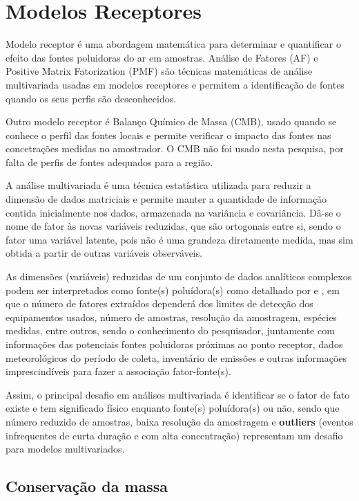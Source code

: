 \section{Modelos Receptores}

Modelo receptor é uma abordagem matemática para determinar e 
quantificar o efeito das fontes poluidoras do ar em amostras.
Análise de Fatores (AF) e Positive Matrix Fatorization (PMF) são técnicas 
matemáticas de análise multivariada usadas em modelos receptores e 
permitem a identificação de fontes quando os seus perfis são desconhecidos.

Outro modelo receptor é Balanço Químico de Massa (CMB), usado quando se conhece 
o perfil das fontes locais e permite verificar o impacto das fontes 
nas concetrações medidas no amostrador. O CMB não foi usado nesta pesquisa, 
por falta de perfis de fontes adequados para a região.

A análise multivariada é uma técnica estatística utilizada para 
reduzir a dimensão de dados matriciais e permite manter a quantidade de 
informação contida inicialmente nos dados, armazenada na variância e covariância. 
Dâ-se o nome de fator às novas variáveis reduzidas, que são ortogonais entre si,  
sendo o fator uma variável latente, pois não é uma grandeza diretamente
medida, mas sim obtida a partir de outras variáveis observáveis. 

As dimensões (variáveis) reduzidas de um conjunto de dados analíticos 
complexos podem ser interpretados como fonte(s) poluídora(s) como detalhado por
\citet{wang2012} e \citet{mansha2012}, em que o número de fatores extraídos 
dependerá dos limites de detecção dos equipamentos usados, número de amostras, 
resolução da amostragem, espécies medidas, entre outros, sendo o conhecimento 
do pesquisador, juntamente com informações das potenciais fontes poluidoras 
próximas ao ponto receptor, dados meteorológicos do período de coleta, 
inventário de emissões e outras informações imprescindíveis para fazer a
associação fator-fonte(s). 

Assim, o principal desafio em análises multivariada 
é identificar se o fator de fato existe e tem significado físico 
enquanto fonte(s) poluídora(s) ou não, sendo que número reduzido de amostras, 
baixa resolução da amostragem e \textbf{outliers} 
(eventos infrequentes de curta duração e com alta concentração) representam 
um desafio para modelos multivariados.

\subsection{Conservação da massa}

